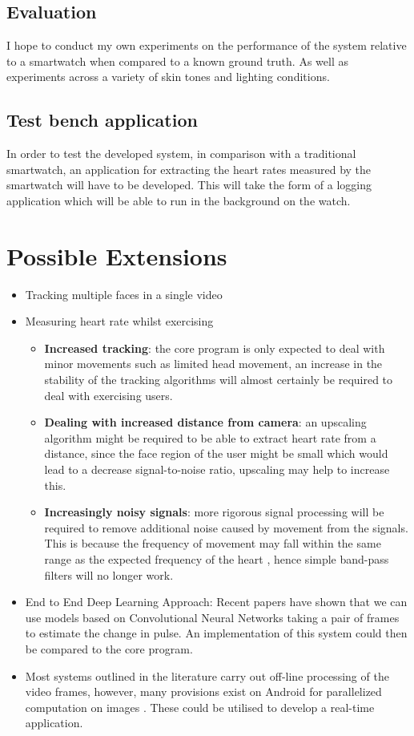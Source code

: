 \subsection*{Evaluation}
I hope to conduct my own experiments on the performance of the system relative to a smartwatch when compared to a known ground truth. As well as experiments across a variety of skin tones and lighting conditions.

\subsection*{Test bench application}
In order to test the developed system, in comparison with a traditional smartwatch, an application for extracting the heart rates measured by the smartwatch will have to be developed. This will take the form of a logging application which will be able to run in the background on the watch.

\section*{Possible Extensions}
\begin{itemize}
    \item Tracking multiple faces in a single video
    \item Measuring heart rate whilst exercising
    \begin{itemize}
        \item \textbf{Increased tracking}: the core program is only expected to deal with minor movements such as limited head movement, an increase in the stability of the tracking algorithms will almost certainly be required to deal with exercising users.
        \item \textbf{Dealing with increased distance from camera}: an upscaling algorithm might be required to be able to extract heart rate from a distance, since the face region of the user might be small which would lead to a decrease signal-to-noise ratio, upscaling may help to increase this.
        \item \textbf{Increasingly noisy signals}: more rigorous signal processing will be required to remove additional noise caused by movement from the signals. This is because the frequency of movement may fall within the same range as the expected frequency of the heart \cite{Peng2014}, hence simple band-pass filters will no longer work.
    \end{itemize}
    \item End to End Deep Learning Approach: Recent papers \cite{10.1007/978-3-030-01216-8_22} have shown that we can use models based on Convolutional Neural Networks taking a pair of frames to estimate the change in pulse. An implementation of this system could then be compared to the core program.
    \item Most systems outlined in the literature carry out off-line processing of the video frames, however, many provisions exist on Android for parallelized computation on images \cite{li2018differentiable}. These could be utilised to develop a real-time application.
\end{itemize}

